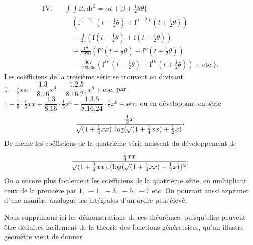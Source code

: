 \[
\begin{aligned}
\mathrm{IV.}\quad&\int\!\int\mathrm{f}t.\,\mathrm{d}t^2=\alpha t+\beta+\tfrac12\theta\theta\bigl\{\\
&\quad(\mathrm{f}^{(-2)}(t-\tfrac12\theta)+\mathrm{f}^{(-2)}(t+\tfrac12\theta))\\
&\quad-\tfrac1{24}(\mathrm{f}(t-\tfrac12\theta)+\mathrm{f}(t+\tfrac12\theta))\\
&\quad+\tfrac{17}{1920}(\mathrm{f}''(t-\tfrac12\theta)+\mathrm{f}''(t+\tfrac12\theta))\\
&\quad-\tfrac{367}{193536}(\mathrm{f}^{\mathrm{IV}}(t-\tfrac12\theta)+\mathrm{f}^{\mathrm{IV}}(t+\tfrac12\theta))+\text{etc.}\bigr\}.
\end{aligned}
\]
Les coëfficiens de la troisième série se trouvent en divisant \(1-\tfrac18xx+\dfrac{1.3}{8.16}x^4-\dfrac{1.2.5}{8.16.24}x^6+\text{etc.}\) par \(1-\tfrac18\cdot\tfrac13xx+\dfrac{1.3}{8.16}\cdot\tfrac15x^4-\dfrac{1.3.5}{8.16.24}\cdot\tfrac17x^6+\text{etc.}\) ou en développant en série
\[
\dfrac{\tfrac12x}{\mathord{{}^{}\!\surd}(1+\tfrac14xx).\log(\mathord{{}^{}\!\surd}(1+\tfrac14xx)+\tfrac12x)}\mathpunct{\cdot}
\]
De même les coëfficiens de la quatrième série naissent du développement de
\[
\dfrac{\tfrac14xx}{\mathord{{}^{}\!\surd}(1+\tfrac14xx).\{\log(\mathord{{}^{}\!\surd}(1+\tfrac14xx)+\tfrac12x)\}^2}\mathpunct{\cdot}
\]
On a encore plus facilement les coëfficiens de la quatrième série, en multipliant ceux de la première par \(1,\ -1,\ -3,\ -5,\ -7\) etc. On pourrait aussi exprimer d’une manière analogue les intégrales d’un ordre plus élevé.
\par Nous supprimons ici les démonstrations de ces théorèmes, puisqu’elles peuvent être déduites facilement de la théorie des fonctions génératrices, qu’un illustre géomètre vient de donner.
\par\endgroup
